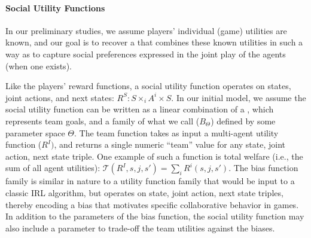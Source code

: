 
\vspace{\up}
\paragraph{Social Utility Functions}

In our preliminary studies, we assume players' individual (game)
utilities are known, and our goal is to recover a  that combines these known utilities in such a way as to
capture social preferences expressed in the joint play of the agents
(when one exists).

Like the players' reward functions, a social utility function operates
on states, joint actions, and next states: $R^S : S \times_i A^i
\times S$.  In our initial model, we assume the social utility function
can be written as a linear combination of a , which
represents team goals,
and a family of what we call  ($B_\Theta$)
defined by some parameter space $\Theta$.  The team function takes as
input a multi-agent utility function ($R^I)$, and returns a single
numeric ``team'' value for any state, joint action, next state
triple. One example of such a function is total welfare (i.e., the sum
of all agent utilities): ${\mathcal T}(R^I, s, j, s') = \sum_i R^i(s, j, s')$.
%
The bias function family is similar in nature to a utility function
family that would be input to a classic IRL algorithm, but operates on
state, joint action, next state triples, thereby encoding a bias that
motivates specific collaborative behavior in games.  In addition to the
parameters of the bias function, the social utility function may also
include a parameter
to trade-off the team utilities against the biases.


